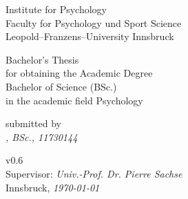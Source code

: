 \begin{titlepage}
   \begin{center}
        Institute for Psychology\\
        Faculty for Psychology und Sport Science\\
        Leopold--Franzens--University Innsbruck
 
        \vspace{4cm}
        \textit{\textbf{\Large {\@title}}}
 
        \vspace{2cm}
        Bachelor's Thesis\\
        for obtaining the Academic Degree\\
        Bachelor of Science (BSc.)\\
        in the academic field Psychology
 
        \vspace{3cm}
        submitted by\\
        \textit{\@author, BSc., 11730144}
 
        \vfill
 
        v0.6\\
        Supervisor: \textit{Univ.-Prof. Dr. Pierre Sachse}\\
        Innsbruck, \textit{\today}
   \end{center}
\end{titlepage}